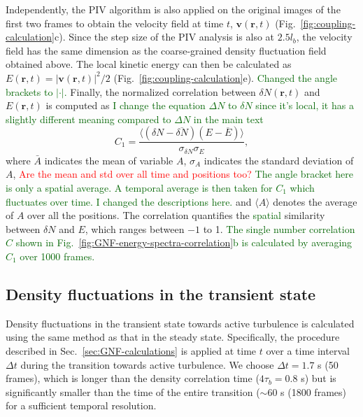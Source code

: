 \documentclass[twocolumn,aps,prx,amsmath,amssymb,longbibliography]{revtex4-2}
\begin{document}
Independently, the PIV algorithm is also applied on the original images of the first two frames to obtain the velocity field at time $t$, $\bm{v}(\bm{r},t)$ (Fig.~\ref{fig:coupling-calculation}c). Since the step size of the PIV analysis is also at $2.5l_b$, the velocity field has the same dimension as the coarse-grained density fluctuation field obtained above. The local kinetic energy can then be calculated as $E(\bm{r},t)= |\bm{v}(\bm{r},t)|^2 /2$ (Fig.~\ref{fig:coupling-calculation}e). \textcolor{darkgreen}{Changed the angle brackets to $|\cdot|$.} Finally, the normalized correlation between $\delta N(\bm{r},t)$ and $E(\bm{r},t)$ is computed as
\textcolor{darkgreen}{I change the equation $\Delta N$ to $\delta N$ since it's local, it has a slightly different meaning compared to $\Delta N$ in the main text}
\begin{equation}
C_1 = \frac{\langle(\delta N-\overline{\delta N})(E-\overline{E})\rangle}{\sigma_{\delta N}\sigma_{E}},
\end{equation}
where $\bar A$ indicates the mean of variable $A$, $\sigma_A$ indicates the standard deviation of $A$, \textcolor{red}{Are the mean and std over all time and positions too?} \textcolor{darkgreen}{The angle bracket here is only a spatial average. A temporal average is then taken for $C_1$ which fluctuates over time. I changed the descriptions here.} and $\langle A \rangle$ denotes the average of $A$ over all the positions. The correlation quantifies the \textcolor{darkgreen}{spatial} similarity between $\delta N$ and $E$, which ranges between $-1$ to 1. \textcolor{darkgreen}{The single number correlation $C$ shown in Fig.~\ref{fig:GNF-energy-spectra-correlation}b is calculated by averaging $C_1$ over 1000 frames.}


\subsection{Density fluctuations in the transient state}
\label{appendix-IA-transient}

Density fluctuations in the transient state towards active turbulence is calculated using the same method as that in the steady state. Specifically, the procedure described in Sec.~\ref{sec:GNF-calculations} is applied at time $t$ over a time interval $\Delta t$ during the transition towards active turbulence. We choose $\Delta t = 1.7$ s (50 frames), which is longer than the density correlation time ($4\tau_b = 0.8$ s) but is significantly smaller than the time of the entire transition ($\sim 60$ s (1800 frames) for a sufficient temporal resolution.



\end{document}
